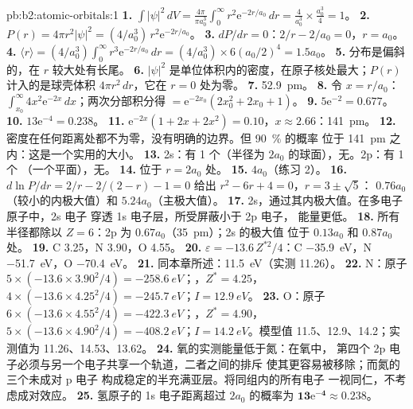 \begin{solution}{pb:b2:atomic-orbitals:1}
\textbf{1.} $\int|\psi|^2\,dV = \frac{4\pi}{\pi a_0^3}\int_0^\infty r^2\mathrm e^{-2r/a_0}\,dr =
\frac{4}{a_0^3} \times \frac{a_0^3}{4} = 1$。
\textbf{2.} $P(r) = 4\pi r^2|\psi|^2 = (4/a_0^3)\,r^2\mathrm e^{-2r/a_0}$。
\textbf{3.} $dP/dr = 0$：$2/r - 2/a_0 = 0$，$r = a_0$。
\textbf{4.} $\langle r\rangle = (4/a_0^3)\int_0^\infty r^3\mathrm e^{-2r/a_0}\,dr = (4/a_0^3)
\times 6(a_0/2)^4 = 1.5a_0$。
\textbf{5.} 分布是偏斜的，在 $r$ 较大处有长尾。
\textbf{6.} $|\psi|^2$ 是单位体积内的密度，在原子核处最大；$P(r)$
计入的是球壳体积 $4\pi r^2\,dr$，它在 $r = 0$ 处为零。
\textbf{7.} \qty{52.9}{pm}。
\textbf{8.} 令 $x = r/a_0$：$\int_{x_0}^\infty 4x^2\mathrm e^{-2x}\,dx$；两次分部积分得
$= \mathrm e^{-2x_0}(2x_0^2 + 2x_0 + 1)$。
\textbf{9.} $5\mathrm e^{-2} = 0.677$。
\textbf{10.} $13\mathrm e^{-4} = 0.238$。
\textbf{11.} $\mathrm e^{-2x}(1 + 2x + 2x^2) = 0.10$，$x \approx 2.66$：\qty{141}{pm}。
\textbf{12.} 密度在任何距离处都不为零，没有明确的边界。但 90~\% 的概率
位于 \qty{141}{pm} 之内：这是一个实用的大小。
\textbf{13.} 2s：有 1 个（半径为 $2a_0$ 的球面），无。2p：有 1 个
（一个平面），无。
\textbf{14.} 位于 $r = 2a_0$ 处。
\textbf{15.} $4a_0$（练习 2）。
\textbf{16.} $d\ln P/dr = 2/r - 2/(2 - r) - 1 = 0$ 给出 $r^2 - 6r + 4 = 0$，$r = 3 \pm \sqrt5$：
$0.76a_0$（较小的内极大值）和 $5.24a_0$（主极大值）。
\textbf{17.} 2s，通过其内极大值。在多电子原子中，2s 电子
穿透 1s 电子层，所受屏蔽小于 2p 电子，
能量更低。
\textbf{18.} 所有半径都除以 $Z = 6$：2p 为 $0.67a_0$（\qty{35}{pm}）；2s 的极大值
位于 $0.13a_0$ 和 $0.87a_0$ 处。
\textbf{19.} C 3.25，N 3.90，O 4.55。
\textbf{20.} $\varepsilon = -13.6\,Z^{*2}/4$：C \qty{-35.9}{eV}，N \qty{-51.7}{eV}，O
\qty{-70.4}{eV}。
\textbf{21.} 同本章所述：\qty{11.5}{eV}（实测 11.26）。
\textbf{22.} N：原子 $5 \times (-13.6 \times 3.90^2/4) = \qty{-258.6}{eV}$；，$Z^* =
4.25$，$4 \times (-13.6 \times 4.25^2/4) = \qty{-245.7}{eV}$；$I = \qty{12.9}{eV}$。
\textbf{23.} O：原子 $6 \times (-13.6 \times 4.55^2/4) = \qty{-422.3}{eV}$；，$Z^* =
4.90$，$5 \times (-13.6 \times 4.90^2/4) = \qty{-408.2}{eV}$；$I = \qty{14.2}{eV}$。模型值
11.5、12.9、14.2；实测值为 11.26、14.53、13.62。
\textbf{24.} 氧的实测能量低于氮：在氧中，
第四个 2p 电子必须与另一个电子共享一个轨道，二者之间的排斥
使其更容易被移除；而氮的三个未成对 p 电子
构成稳定的半充满亚层。将同组内的所有电子
一视同仁，不考虑成对效应。
\textbf{25.} 氢原子的 1s 电子距离超过 $2a_0$ 的概率为
$\boldsymbol{13\mathrm e^{-4} \approx 0.238}$。
\end{solution}
